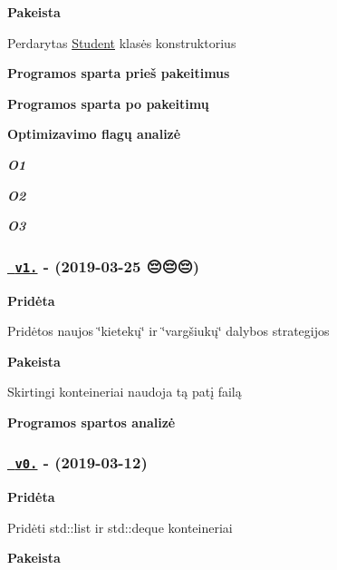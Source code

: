 {\bfseries{Pakeista}}


\begin{DoxyItemize}
\item Perdarytas {\ttfamily \mbox{\hyperlink{class_student}{Student}}} klasės konstruktorius
\end{DoxyItemize}

{\bfseries{Programos sparta prieš pakeitimus}} 

{\bfseries{Programos sparta po pakeitimų}} 

{\bfseries{Optimizavimo flagų analizė}}

{\itshape {\bfseries{O1}}} 

{\itshape {\bfseries{O2}}} 

{\itshape {\bfseries{O3}}} 

\subsubsection*{\href{https://github.com/emilisb/OOP-2/releases/tag/v1.0}{\texttt{ v1.}} -\/ (2019-\/03-\/25 😔😔😔)}

{\bfseries{Pridėta}}


\begin{DoxyItemize}
\item Pridėtos naujos \char`\"{}kietekų\char`\"{} ir \char`\"{}vargšiukų\char`\"{} dalybos strategijos
\end{DoxyItemize}

{\bfseries{Pakeista}}


\begin{DoxyItemize}
\item Skirtingi konteineriai naudoja tą patį failą
\end{DoxyItemize}

{\bfseries{Programos spartos analizė}}



\subsubsection*{\href{https://github.com/emilisb/OOP-2/releases/tag/v0.5}{\texttt{ v0.}} -\/ (2019-\/03-\/12)}

{\bfseries{Pridėta}}


\begin{DoxyItemize}
\item Pridėti {\ttfamily std\+::list} ir {\ttfamily std\+::deque} konteineriai
\end{DoxyItemize}

{\bfseries{Pakeista}}


